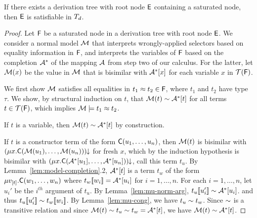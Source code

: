\begin{lemma}%
\label{lem:ss}%
\afterDot
If there exists a derivation tree with root node $\mathsf{E}$ containing a saturated node, then $\mathsf{E}$ is satisfiable in $T_{d}$.
\end{lemma}
\begin{proof}
Let $\mathsf{F}$ be a saturated node in a derivation tree with root node $\mathsf{E}$.
We consider a normal model $\mathcal{M}$ 
that interprets wrongly-applied selectors based on equality information in $\mathsf{F}$,
and interprets the variables of $\mathsf{F}$ based on the completion $\mathcal{A}^\ast$ of the mapping $\mathcal{A}$ from step two of our calculus.
For the latter, let $\mathcal{M}( x )$ be the value in $\mathcal{M}$ that is bisimilar with $\mathcal{A}^\ast [ x ]$ for each variable $x$ in $\mathcal{T}(\mathsf{F})$.

We first show $\mathcal{M}$ satisfies all equalities in $t_1 \approx t_2 \in \mathsf{F}$, where $t_1$ and $t_2$ have type $\tau$.
We show,
by structural induction on $t$,
that $\mathcal{M}( t ) \sim \mathcal{A}^\ast [ t ]$ for all terms $t \in \mathcal{T}( \mathsf{F} )$,
which implies $\mathcal{M} \models t_1 \approx t_2$.

If $t$ is a variable, then $\mathcal{M}( t ) \sim \mathcal{A}^\ast [  t  ]$ by construction.

If $t$ is a constructor term of the form $\textsf{C}( u_1, \ldots, u_n )$, 
then $\mathcal{M}( t )$ is bisimilar with ${(\mu x. \textsf{C}( \mathcal{M}( u_1 ), \ldots, \mathcal{M}( u_n ) ) )}\!\!\downarrow$ for fresh $x$,
which by the induction hypothesis is bisimilar with ${(\mu x. \textsf{C}( \mathcal{A}^\ast [  u_1  ], \ldots, \mathcal{A}^\ast [  u_n  ] ) )}\!\!\downarrow$, call this term $t_u$.
By Lemma~\ref{lem:model-completion}.2, $\mathcal{A}^\ast [ t ]$ is a term
$t_w$ of the form $\mu v_{[ t ]}. \textsf{C}( w_1, \ldots, w_n )$
where $t_w[\![ w_i ]\!] = \mathcal{A}^\ast [ u_i ]$ for $i = 1, \ldots, n$.
For each $i = 1, \ldots, n$, let $u_i'$ be the $i^{th}$ argument of $t_u$.
By Lemma~\ref{lem:mu-norm-arg}, $t_u[\![ u_i' ]\!] \sim \mathcal{A}^\ast [ u_i ]$.
and thus $t_u[\![ u_i' ]\!] \sim t_w[\![  w_i  ]\!]$. %
By Lemma~\ref{lem:mu-cong}, we have $t_u \sim t_w$.
Since $\sim$ is a transitive relation and since $\mathcal{M}( t ) \sim t_u \sim t_w = \mathcal{A}^\ast [ t ]$,
we have $\mathcal{M}( t ) \sim \mathcal{A}^\ast [ t ]$.


\end{proof}
